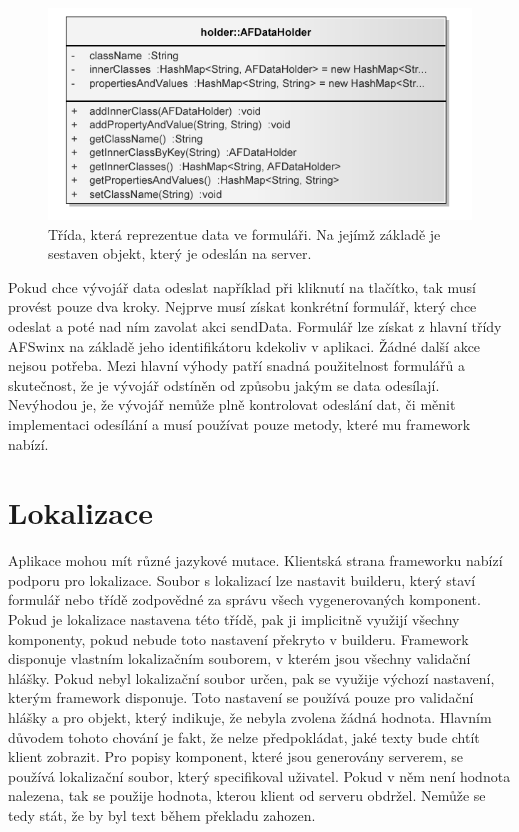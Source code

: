 \begin{figure}[h!]
\begin{center}
\includegraphics{images/AFDataHolder}
\caption{Třída, která reprezentue data ve formuláři. Na jejímž základě je	sestaven objekt, který je odeslán na server.}
\label{img:afDataHolder}
\end{center}
\end{figure}

Pokud chce vývojář data odeslat například při kliknutí na tlačítko, tak musí provést pouze dva kroky. Nejprve musí získat konkrétní formulář, který chce odeslat a poté nad ním zavolat akci sendData. Formulář lze získat z hlavní třídy AFSwinx na základě jeho identifikátoru kdekoliv v aplikaci. Žádné další akce nejsou potřeba. Mezi hlavní výhody patří snadná použitelnost formulářů a skutečnost, že je vývojář odstíněn od způsobu jakým se data odesílají. Nevýhodou je, že vývojář nemůže plně kontrolovat odeslání dat, či měnit implementaci odesílání a musí používat pouze metody, které mu framework nabízí.
\section{Lokalizace}
Aplikace mohou mít různé jazykové mutace. Klientská strana frameworku nabízí podporu pro lokalizace. Soubor s lokalizací lze nastavit builderu, který staví formulář nebo třídě zodpovědné za správu všech vygenerovaných komponent. Pokud je lokalizace nastavena této třídě, pak ji implicitně využijí všechny komponenty, pokud nebude toto nastavení překryto v builderu. Framework disponuje vlastním lokalizačním souborem, v kterém jsou všechny validační hlášky. Pokud nebyl lokalizační soubor určen, pak se využije výchozí nastavení, kterým framework disponuje. Toto nastavení se používá pouze pro validační hlášky a pro objekt, který indikuje, že nebyla zvolena žádná hodnota. Hlavním důvodem tohoto chování je fakt, že nelze předpokládat, jaké texty bude chtít klient zobrazit. Pro popisy komponent, které jsou generovány serverem, se používá lokalizační soubor, který specifikoval uživatel. Pokud v něm není hodnota nalezena, tak se použije hodnota, kterou klient od serveru obdržel. Nemůže se tedy stát, že by byl text během překladu zahozen.
